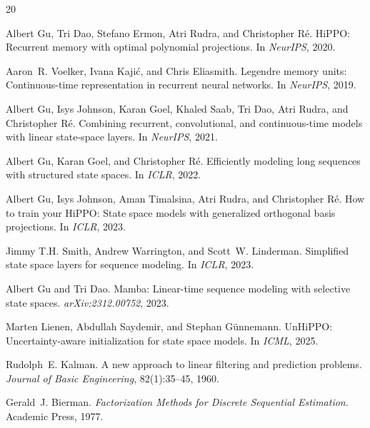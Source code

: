 \documentclass[11pt]{article}
\begin{document}
\begin{thebibliography}{20}

Albert Gu, Tri Dao, Stefano Ermon, Atri Rudra, and Christopher R\'e.
\newblock HiPPO: Recurrent memory with optimal polynomial projections.
\newblock In \emph{NeurIPS}, 2020.

Aaron~R. Voelker, Ivana Kaji\'c, and Chris Eliasmith.
\newblock Legendre memory units: Continuous-time representation in recurrent neural networks.
\newblock In \emph{NeurIPS}, 2019.

Albert Gu, Isys Johnson, Karan Goel, Khaled Saab, Tri Dao, Atri Rudra, and Christopher R\'e.
\newblock Combining recurrent, convolutional, and continuous-time models with linear state-space layers.
\newblock In \emph{NeurIPS}, 2021.

Albert Gu, Karan Goel, and Christopher R\'e.
\newblock Efficiently modeling long sequences with structured state spaces.
\newblock In \emph{ICLR}, 2022.

Albert Gu, Isys Johnson, Aman Timalsina, Atri Rudra, and Christopher R\'e.
\newblock How to train your HiPPO: State space models with generalized orthogonal basis projections.
\newblock In \emph{ICLR}, 2023.

Jimmy T.H. Smith, Andrew Warrington, and Scott~W. Linderman.
\newblock Simplified state space layers for sequence modeling.
\newblock In \emph{ICLR}, 2023.

Albert Gu and Tri Dao.
\newblock Mamba: Linear-time sequence modeling with selective state spaces.
\newblock \emph{arXiv:2312.00752}, 2023.

Marten Lienen, Abdullah Saydemir, and Stephan G\"unnemann.
\newblock UnHiPPO: Uncertainty-aware initialization for state space models.
\newblock In \emph{ICML}, 2025.

Rudolph~E. Kalman.
\newblock A new approach to linear filtering and prediction problems.
\newblock \emph{Journal of Basic Engineering}, 82(1):35--45, 1960.

Gerald~J. Bierman.
\newblock \emph{Factorization Methods for Discrete Sequential Estimation}.
\newblock Academic Press, 1977.


\end{thebibliography}
\end{document}
